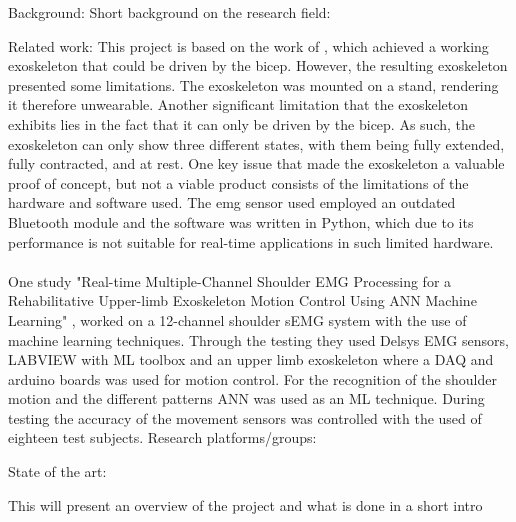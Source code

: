 Background: 
    Short background on the research field:

    Related work: %
        This project is based on the work of \cite{AFES}, which achieved a working exoskeleton that could be driven by the bicep. However, the resulting 
        exoskeleton presented some limitations. The exoskeleton was mounted on a stand, rendering it therefore unwearable. Another significant limitation 
        that the exoskeleton exhibits lies in the fact that it can only be driven by the bicep. As such, the exoskeleton can only show three different states, 
        with them being fully extended, fully contracted, and at rest. One key issue that made the exoskeleton a valuable proof of concept, but not a viable 
        product consists of the limitations of the hardware and software used. The \acs{emg} sensor used employed an outdated Bluetooth module and the software was 
        written in Python, which due to its performance is not suitable for real-time applications in such limited hardware. 
        \\\\
        One study "Real-time Multiple-Channel Shoulder EMG Processing for a Rehabilitative Upper-limb Exoskeleton Motion Control Using ANN Machine Learning" \cite{shoulderexo},
        worked on a 12-channel shoulder sEMG system with the use of machine learning techniques. Through the testing they used Delsys EMG sensors, LABVIEW with ML toolbox and an 
        upper limb exoskeleton where a DAQ and arduino boards was used for motion control. For the recognition of the shoulder motion and the different patterns ANN was used as an 
        ML technique. During testing the accuracy of the movement sensors was controlled with the used of eighteen test subjects.
    Research platforms/groups:

    State of the art:


    This will present an overview of the project and what is done in a short intro
